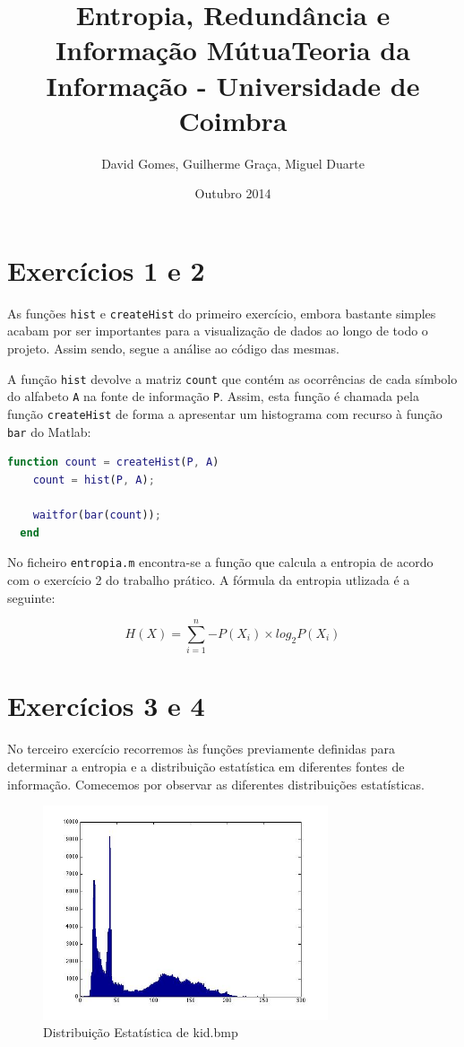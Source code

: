 \documentclass[12pt]{article}
\title{Entropia, Redundância e Informação Mútua}
\title{Teoria da Informação - Universidade de Coimbra}
\author{David Gomes, Guilherme Graça, Miguel Duarte}
\date{Outubro 2014}
\begin{document}
\maketitle

\section*{Exercícios 1 e 2}
  As funções \texttt{hist} e \texttt{createHist} do primeiro exercício, embora bastante
  simples acabam por ser importantes para a visualização de dados ao longo
  de todo o projeto. Assim sendo, segue a análise ao código das mesmas.

  A função \texttt{hist} devolve a matriz \texttt{count} que contém as ocorrências
  de cada símbolo do alfabeto \texttt{A} na fonte de informação \texttt{P}. Assim,
  esta função é chamada pela função \texttt{createHist} de forma a apresentar um histograma
  com recurso à função \texttt{bar} do Matlab:

  \vspace{2mm}
  \begin{lstlisting}[language=Matlab]
  function count = createHist(P, A)
    count = hist(P, A);

    waitfor(bar(count));
  end
  \end{lstlisting}

  No ficheiro \texttt{entropia.m} encontra-se a função que calcula a entropia de acordo
  com o exercício 2 do trabalho prático. A fórmula da entropia utlizada é a seguinte:

  $$
    H(X) = \sum_{i=1}^{n}{-P(X_i) \times log_2 P(X_i)}
  $$

\section*{Exercícios 3 e 4}
  No terceiro exercício recorremos às funções previamente definidas para determinar
  a entropia e a distribuição estatística em diferentes fontes de informação.
  Comecemos por observar as diferentes distribuições estatísticas.

  \begin{figure}[H]
    \centering
      \includegraphics[width=0.75\textwidth]{ex3kid}
    \caption{Distribuição Estatística de kid.bmp}
  \end{figure}
\end{document}
